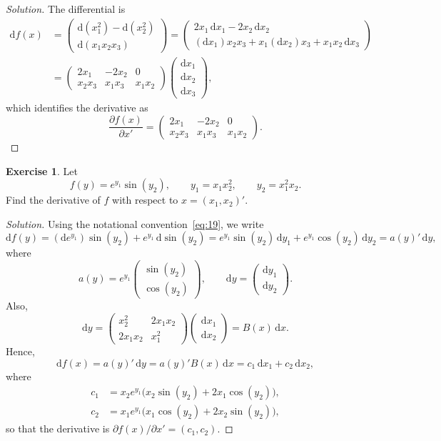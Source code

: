 \documentclass[14pt]{extarticle}
\theoremstyle{plain}
\theoremstyle{definition}
\newtheorem{exercise}{Exercise}
\theoremstyle{remark}
\newenvironment{solution}{%
  \begin{proof}[Solution]%
}{%
  \end{proof}%
}
\newcommand{\dd}{\mathrm{d}}
\begin{document}
\begin{solution}
The differential is
\begin{align*}
\dd f(x) &= \begin{pmatrix} \dd(x_1^2) - \dd(x_2^2) \\ \dd(x_1 x_2 x_3) \end{pmatrix}
= \begin{pmatrix} 2x_1\, \dd x_1 - 2x_2\, \dd x_2 \\ (\dd x_1) x_2 x_3 + x_1 (\dd x_2) x_3 + x_1 x_2\, \dd x_3 \end{pmatrix} \\
&= \begin{pmatrix} 2x_1 & -2x_2 & 0 \\ x_2 x_3 & x_1 x_3 & x_1 x_2 \end{pmatrix}
\begin{pmatrix} \dd x_1 \\ \dd x_2 \\ \dd x_3 \end{pmatrix},
\end{align*}
which identifies the derivative as
\[
\frac{\partial f(x)}{\partial x'}
= \begin{pmatrix} 2x_1 & -2x_2 & 0 \\ x_2 x_3 & x_1 x_3 & x_1 x_2 \end{pmatrix}.
\]
\end{solution}

\begin{exercise}\label{exer:13}
Let
\[
f(y) = e^{y_1} \sin(y_2), \qquad y_1 = x_1 x_2^2, \qquad y_2 = x_1^2 x_2.
\]
Find the derivative of $f$ with respect to $x = (x_1, x_2)'$.
\end{exercise}

\begin{solution}
Using the notational convention~\eqref{eq:19}, we write
\[
\dd f(y) = (\dd e^{y_1})\sin(y_2) + e^{y_1}\, \dd\sin(y_2)
= e^{y_1}\sin(y_2)\, \dd y_1 + e^{y_1}\cos(y_2)\, \dd y_2 = a(y)'\, \dd y,
\]
where
\[
a(y) = e^{y_1} \begin{pmatrix} \sin(y_2) \\ \cos(y_2) \end{pmatrix}, \qquad
\dd y = \begin{pmatrix} \dd y_1 \\ \dd y_2 \end{pmatrix}.
\]
Also,
\[
\dd y = \begin{pmatrix} x_2^2 & 2x_1 x_2 \\ 2x_1 x_2 & x_1^2 \end{pmatrix}
\begin{pmatrix} \dd x_1 \\ \dd x_2 \end{pmatrix} = B(x)\, \dd x.
\]
Hence,
\[
\dd f(x) = a(y)'\, \dd y = a(y)' B(x)\, \dd x = c_1\, \dd x_1 + c_2\, \dd x_2,
\]
where
\begin{align*}
c_1 &= x_2 e^{y_1}\bigl(x_2 \sin(y_2) + 2x_1 \cos(y_2)\bigr), \\
c_2 &= x_1 e^{y_1}\bigl(x_1 \cos(y_2) + 2x_2 \sin(y_2)\bigr),
\end{align*}
so that the derivative is $\partial f(x)/\partial x' = (c_1, c_2)$.
\end{solution}
\end{document}
